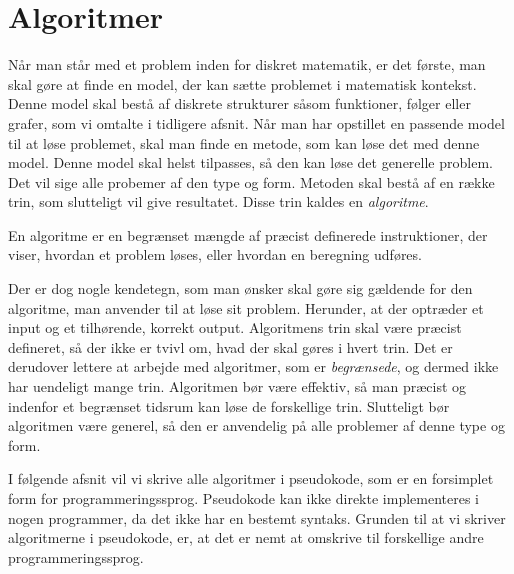 \chapter{Algoritmer} \label{kap.algo}
Når man står med et problem inden for diskret matematik, er det første, man skal gøre at finde en model, der kan sætte problemet i matematisk kontekst. Denne model skal bestå af diskrete strukturer såsom funktioner, følger eller grafer, som vi omtalte i tidligere afsnit. Når man har opstillet en passende model til at løse problemet, skal man finde en metode, som kan løse det med denne model. Denne model skal helst tilpasses, så den kan løse det generelle problem. Det vil sige alle probemer af den type og form. Metoden skal bestå af en række trin, som slutteligt vil give resultatet. Disse trin kaldes en \emph{algoritme}. 
\begin{defn}
[Algoritmer] En algoritme er en begrænset mængde af præcist definerede instruktioner, der viser, hvordan et problem løses, eller hvordan en beregning udføres. 
\end{defn}

Der er dog nogle kendetegn, som man ønsker skal gøre sig gældende for den algoritme, man anvender til at løse sit problem. Herunder, at der optræder et input og et tilhørende, korrekt output. Algoritmens trin skal være præcist defineret, så der ikke er tvivl om, hvad der skal gøres i hvert trin. Det er derudover lettere at arbejde med algoritmer, som er \emph{begrænsede}, og dermed ikke har uendeligt mange trin. Algoritmen bør være effektiv, så man præcist og indenfor et begrænset tidsrum kan løse de forskellige trin. Slutteligt bør algoritmen være generel, så den er anvendelig på alle problemer af denne type og form.

I følgende afsnit vil vi skrive alle algoritmer i pseudokode, som er en forsimplet form for programmeringssprog. Pseudokode kan ikke direkte implementeres i nogen programmer, da det ikke har en bestemt syntaks. Grunden til at vi skriver algoritmerne i pseudokode, er, at det er nemt at omskrive til forskellige andre programmeringssprog.






